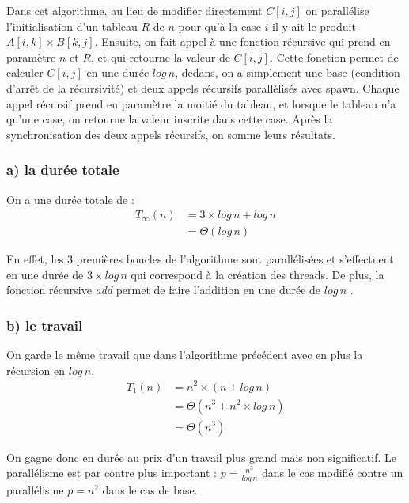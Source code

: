 Dans cet algorithme, au lieu de modifier directement $C[i,j]$ on parallélise l'initialisation d'un tableau $R$ de $n$ pour qu'à la case $i$ il y ait le produit $A[i,k] \times B[k,j]$. Ensuite, on fait appel à une fonction récursive qui prend en paramètre $n$ et $R$, et qui retourne la valeur de $C[i,j]$. Cette fonction permet de calculer $C[i,j]$ en une durée $log \, n$,
dedans, on a simplement une base (condition d'arrêt de la récursivité) et deux appels récursifs parallèlisés avec spawn. Chaque appel récursif prend en paramètre la moitié du tableau, et lorsque le tableau n'a qu'une case, on retourne la valeur inscrite dans cette case. Après la synchronisation des deux appels récursifs, on somme leurs résultats.



\cleardoublepage



\subsubsection*{a) la durée totale}

On a une durée totale de :
\begin{equation} \label{eq1}
\begin{split}
T_\infty(n) & = 3 \times log \, n + log \, n\\ 
 & = \Theta (log \, n)
\end{split}
\end{equation}

En effet, les $3$ premières boucles de l'algorithme sont parallélisées et s'effectuent en une durée de $3 \times log \, n$ qui correspond à la création des threads. De plus, la fonction récursive \textit{add} permet de faire l'addition en une durée de $log \, n$ .

\subsubsection*{b) le travail}

On garde le même travail que dans l'algorithme précédent avec en plus la récursion en $log \, n$.
\begin{equation} \label{eq2}
\begin{split}
T_1(n) & = n^2 \times  (n + log \, n)\\ 
 & = \Theta (n^3 + n^2 \times log \, n)\\
 & = \Theta (n^3)
\end{split}
\end{equation}

On gagne donc en durée au prix d'un travail plus grand mais non significatif. Le parallélisme est par contre plus important :
$p = \frac{n^3}{log \, n}$ dans le cas modifié contre un parallélisme $p = n^2$ dans le cas de base.